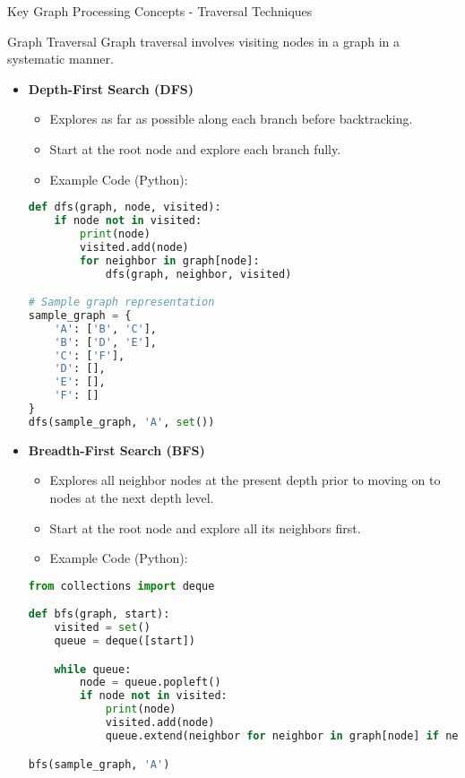 \documentclass[aspectratio=169]{beamer}
\begin{document}
\begin{frame}[fragile]{Key Graph Processing Concepts - Traversal Techniques}
    \begin{block}{Graph Traversal}
        Graph traversal involves visiting nodes in a graph in a systematic manner.
    \end{block}
    
    \begin{itemize}
        \item \textbf{Depth-First Search (DFS)}
            \begin{itemize}
                \item Explores as far as possible along each branch before backtracking.
                \item Start at the root node and explore each branch fully.
                \item Example Code (Python):
                \end{itemize}
                \begin{lstlisting}[language=Python]
def dfs(graph, node, visited):
    if node not in visited:
        print(node)
        visited.add(node)
        for neighbor in graph[node]:
            dfs(graph, neighbor, visited)

# Sample graph representation
sample_graph = {
    'A': ['B', 'C'],
    'B': ['D', 'E'],
    'C': ['F'],
    'D': [],
    'E': [],
    'F': []
}
dfs(sample_graph, 'A', set())
                \end{lstlisting}
        
        \item \textbf{Breadth-First Search (BFS)}
            \begin{itemize}
                \item Explores all neighbor nodes at the present depth prior to moving on to nodes at the next depth level.
                \item Start at the root node and explore all its neighbors first.
                \item Example Code (Python):
                \end{itemize}
                \begin{lstlisting}[language=Python]
from collections import deque

def bfs(graph, start):
    visited = set()
    queue = deque([start])

    while queue:
        node = queue.popleft()
        if node not in visited:
            print(node)
            visited.add(node)
            queue.extend(neighbor for neighbor in graph[node] if neighbor not in visited)

bfs(sample_graph, 'A')
                \end{lstlisting}
    \end{itemize}
\end{frame}
\end{document}
